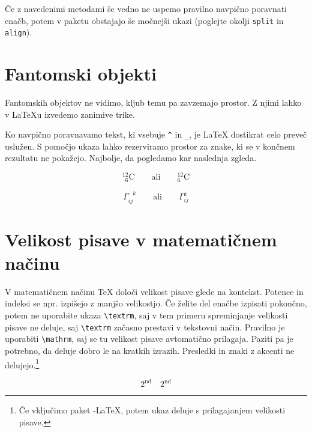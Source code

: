 Če z navedenimi metodami še vedno ne uspemo pravilno navpično poravnati
enačb, potem v paketu  obstajajo še 
močnejši ukazi (poglejte okolji \verb|split| in \verb|align|).


\section{Fantomski objekti}

Fantomskih objektov ne vidimo, kljub temu pa zavzemajo prostor. Z njimi lahko v \LaTeX{}u izvedemo
zanimive trike.

Ko navpično poravnavamo tekst, ki vsebuje \verb|^| in \verb|_|, je \LaTeX{} dostikrat 
celo preveč uslužen. S pomočjo ukaza  lahko rezerviramo prostor za znake, ki se v končnem 
rezultatu ne pokažejo. Najbolje, da pogledamo kar naslednja zgleda.
\begin{example}
\begin{displaymath}
{}^{12}_{\phantom{1}6}\textrm{C}
\qquad \textrm{ali} \qquad
{}^{12}_{6}\textrm{C}
\end{displaymath}
\end{example}
\begin{example}
\begin{displaymath} 
\Gamma_{ij}^{\phantom{ij}k}
\qquad \textrm{ali} \qquad
\Gamma_{ij}^{k}
\end{displaymath}  
\end{example}

\section{Velikost pisave v matematičnem načinu}\label{sec:fontsz}

 V matematičnem načinu \TeX{} določi velikost pisave 
glede na kontekst. Potence in indeksi se npr. izpišejo z manjšo velikostjo. 
Če želite del enačbe izpisati pokončno, potem ne uporabite ukaza 
\verb|\textrm|, saj v tem primeru spreminjanje velikosti pisave ne deluje,
saj \verb|\textrm| začasno prestavi v tekstovni način. Pravilno je 
uporabiti \verb|\mathrm|, saj se tu velikost pisave avtomatično prilagaja. Paziti pa je potrebno,
da  deluje dobro le na kratkih izrazih. 
Presledki in znaki z akcenti ne delujejo.\footnote{Če vključimo paket \AmS-\LaTeX{}, potem ukaz  deluje s prilagajanjem velikosti pisave.}
\begin{example}
\begin{equation}
2^{\textrm{nd}} \quad 
2^{\mathrm{nd}}
\end{equation}
\end{example}


